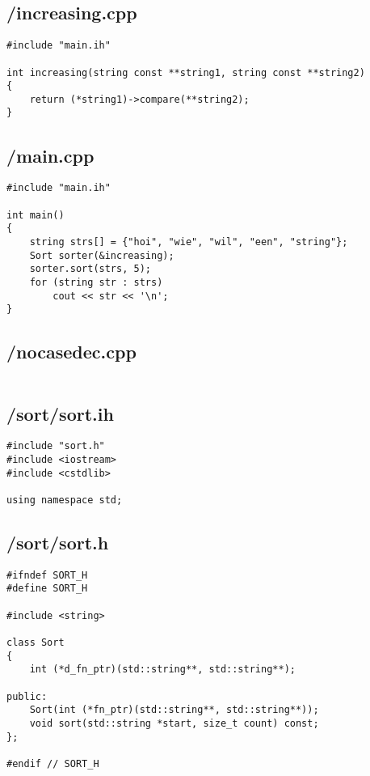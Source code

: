 \documentclass{article}
\begin{document}
\subsection*{/increasing.cpp}
\begin{verbatim}
#include "main.ih"

int increasing(string const **string1, string const **string2)
{
    return (*string1)->compare(**string2);
}

\end{verbatim}
\subsection*{/main.cpp}
\begin{verbatim}
#include "main.ih"

int main()
{
    string strs[] = {"hoi", "wie", "wil", "een", "string"};
    Sort sorter(&increasing);
    sorter.sort(strs, 5);
    for (string str : strs)
        cout << str << '\n';
}
\end{verbatim}
\subsection*{/nocasedec.cpp}
\begin{verbatim}

\end{verbatim}
\subsection*{/sort/sort.ih}
\begin{verbatim}
#include "sort.h"
#include <iostream>
#include <cstdlib>

using namespace std;

\end{verbatim}
\subsection*{/sort/sort.h}
\begin{verbatim}
#ifndef SORT_H
#define SORT_H

#include <string>

class Sort
{
    int (*d_fn_ptr)(std::string**, std::string**);

public:
    Sort(int (*fn_ptr)(std::string**, std::string**));
    void sort(std::string *start, size_t count) const;
};

#endif // SORT_H


\end{verbatim}
\end{document}
